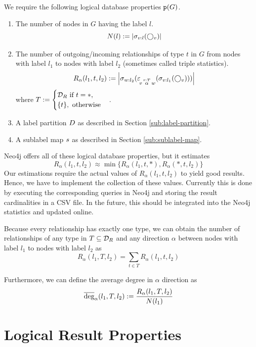 We require the following logical database properties $\texttt{p}(G)$.
\begin{enumerate}[1.]
  \item The number of nodes in $G$ having the label $l$.
    \[
      N(l) := {\left \vert \sigma_{v:l}(\bigcirc_{v}) \right \vert}
    \]
  \item The number of outgoing/incoming relationships of type $t$ in $G$
    from nodes with label $l_1$ to nodes with label $l_2$ (sometimes called
    triple statistics).
    \[
      R_\alpha(l_1, t, l_2) := {\left \vert \sigma_{w:l_2}(
        \varepsilon\!_{v\, \overset{r:T}{\alpha} \, w}(\sigma_{v:l_1}(\bigcirc_{v}))
        ) \right \vert}
    \]
    where $T := \begin{cases}
                  \mathcal{D}_R \text{ if } t = *, \\
                  \{ t \}, \text{ otherwise}
                \end{cases}$.
  \item A label partition $D$ as described in Section
    \ref{sub:label-partition}.
  \item A sublabel map $s$ as described in Section
    \ref{sub:sublabel-map}.
\end{enumerate}

Neo4j offers all of these logical database properties, but it estimates
\[
  R_\alpha(l_1, t, l_2) \approx \min \{ R_\alpha(l_1, t, *),
                                        R_\alpha(*, t, l_2) \}
\]
Our estimations require the actual values of $R_\alpha(l_1, t, l_2)$
to yield good results. Hence, we have to implement the collection of these
values. Currently this is done by executing the corresponding queries
in Neo4j and storing the result cardinalities in a CSV file.
In the future, this should be integrated into the Neo4j statistics and updated
online.

Because every relationship has exactly one type, we can obtain the number of
relationships of any type in $T \subseteq \mathcal{D}_R$ and any direction $\alpha$
between nodes with label $l_1$ to nodes with label $l_2$ as
\[
  R_\alpha(l_1, T, l_2) = \sum_{t \in T} R_\alpha(l_1, t, l_2)
\]

Furthermore, we can define the average degree in $\alpha$ direction as
\[
  \avgdeg_\alpha(l_1, T, l_2) := \frac{R_\alpha(l_1, T, l_2)}{N(l_1)}
\]

\section{Logical Result Properties}
\label{sub:neo4j-log-result-props}

